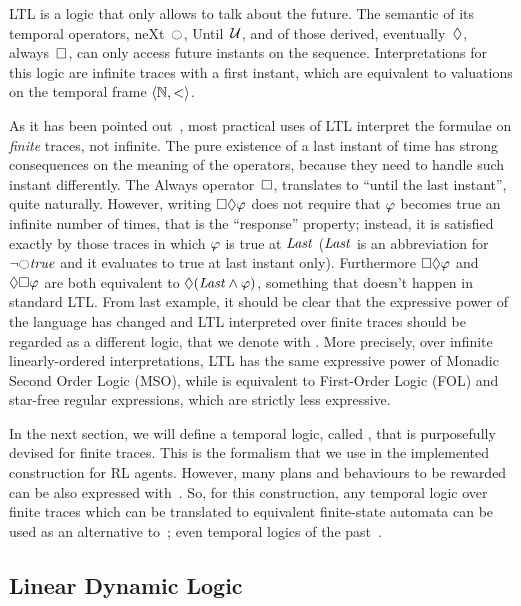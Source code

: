 LTL is a logic that only allows to talk about the future. The semantic of its
temporal operators, neXt~$\next$, Until~$\mathcal{U}$, and of those derived,
eventually~$\lozenge$, always~$\square$, can only access future instants on
the sequence. Interpretations for this logic are infinite traces with a first
instant, which are equivalent to valuations on the temporal frame $\langle \mathbb{N},
< \rangle$.

As it has been pointed out~\cite{bib:ltlf-ldlf}, most practical uses of LTL
interpret the formulae on \emph{finite} traces, not infinite. The pure
existence of a last instant of time has strong consequences on the meaning of
the operators, because they need to handle such instant differently. The
Always operator~$\square$, translates to ``until the last instant'', quite
naturally. However, writing $\square\lozenge \varphi$ does not require
that $\varphi$ becomes true an infinite number of times, that is the
``response'' property; instead, it is satisfied exactly by those traces in
which $\varphi$ is true at $\text{\textit{Last}}$ ($\text{\textit{Last}}$ is an abbreviation
for $\lnot \next \true$ and it evaluates to true at last instant only).
Furthermore $\square\lozenge \varphi$ and $\lozenge\square \varphi$
are both equivalent to $\lozenge (\text{\textit{Last}} \land \varphi)$, something
that doesn't happen in standard LTL. From last example, it should be clear
that the expressive power of the language has changed and LTL interpreted over
finite traces should be regarded as a different logic, that we denote with
\ltl{}. More precisely, over infinite linearly-ordered interpretations, LTL
has the same expressive power of Monadic Second Order Logic (MSO), while
\ltl{} is equivalent to First-Order Logic (FOL) and star-free regular
expressions, which are strictly less expressive.

In the next section, we will define a temporal logic, called \ldl{}, that is
purposefully devised for finite traces. This is the formalism that we use in
the implemented construction for RL agents. However, many plans and behaviours
to be rewarded can be also expressed with~\ltl{}. So, for this construction,
any temporal logic over finite traces which can be translated to equivalent
finite-state automata can be used as an alternative to~\ldl{}; even temporal
logics of the past~\cite{bib:nmrdp-logic-first}.


\subsection{Linear Dynamic Logic}

